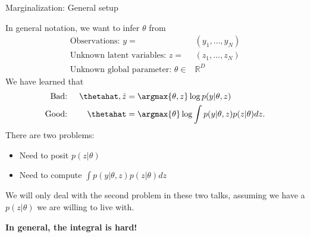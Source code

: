 

\begin{frame}{Marginalization: General setup}

In general notation, we want to infer $\theta$ from
%
\begin{align*}
    \textrm{Observations: }y ={}& (y_1, \ldots, y_N)\\
    \textrm{Unknown latent variables: }z ={}& (z_1, \ldots, z_N)\\
    \textrm{Unknown global parameter: }\theta \in{}& \mathbb{R}^D
\end{align*}
%
We have learned that
%
\begin{align*}
%
\textrm{Bad: }&& \thetahat, \hat{z} ={}& \argmax{\theta, z} \log p(y | \theta, z)\\
\textrm{Good: }&& \thetahat ={}&
    \argmax{\theta} \log \int p(y | \theta, z) p(z | \theta) dz.
%
\end{align*}
%
\pause
%
There are two problems:
%
\begin{itemize}
    \item Need to posit $p(z | \theta)$
    \item Need to compute $\int p(y | \theta, z) p(z | \theta) dz$
\end{itemize}
%

We will only deal with the second problem in these two talks, assuming
we have a $p(z | \theta)$ we are willing to live with.

\textbf{In general, the integral is hard!}


\end{frame}





